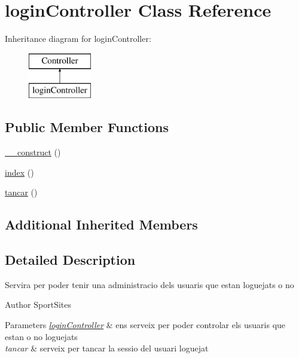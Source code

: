 \hypertarget{classlogin_controller}{}\section{login\+Controller Class Reference}
\label{classlogin_controller}
Inheritance diagram for login\+Controller\+:\begin{figure}[H]
\begin{center}
\leavevmode
\includegraphics[height=2.000000cm]{classlogin_controller}
\end{center}
\end{figure}
\subsection*{Public Member Functions}
\begin{DoxyCompactItemize}
\item 
\hyperlink{classlogin_controller_a095c5d389db211932136b53f25f39685}{\+\_\+\+\_\+construct} ()
\item 
\hyperlink{classlogin_controller_a149eb92716c1084a935e04a8d95f7347}{index} ()
\item 
\hyperlink{classlogin_controller_a106a75f65c7002e9595632a78c8bff9a}{tancar} ()
\end{DoxyCompactItemize}
\subsection*{Additional Inherited Members}


\subsection{Detailed Description}
Servira per poder tenir una administracio dels usuaris que estan loguejats o no

\begin{DoxyAuthor}{Author}
Sport\+Sites 
\end{DoxyAuthor}

\begin{DoxyParams}{Parameters}
{\em \hyperlink{classlogin_controller}{login\+Controller}} & ens serveix per poder controlar els usuaris que estan o no loguejats \\
\hline
{\em tancar} & serveix per tancar la sessio del usuari loguejat \\
\hline
\end{DoxyParams}


